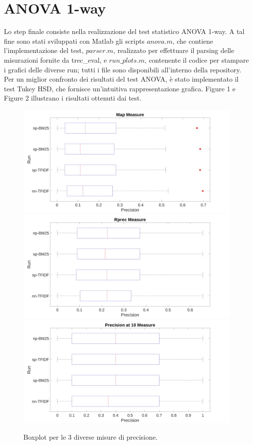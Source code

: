 \documentclass[a4paper, 11pt]{article}
\begin{document}
\section*{ANOVA 1-way}
\noindent
Lo step finale consiste nella realizzazione del test statistico ANOVA 1-way. A tal fine sono stati sviluppati con Matlab gli scripts $anova.m$, che contiene l'implementazione del test, $parser.m$, realizzato per effettuare il parsing delle misurazioni fornite da trec\_eval, e $run\_plots.m$, contenente il codice per stampare i grafici delle diverse run; tutti i file sono disponibili all'interno della repository. Per un miglior confronto dei risultati del test ANOVA, è stato implementato il test Tukey HSD, che fornisce un'intuitiva rappresentazione grafica.
Figure 1 e Figure 2 illustrano i risultati ottenuti dai test.
\\
\begin{figure}[!htb]
  \includegraphics[width=\linewidth]{../Plots/mean-boxplot.jpeg}
\endminipage\hfill
{}
  \includegraphics[width=\linewidth]{../Plots/rprec-boxplot.jpeg}
\endminipage\hfill
{}%
  \includegraphics[width=\linewidth]{../Plots/p10-boxplot.jpeg}
\endminipage
\caption{Boxplot per le 3 diverse misure di precisione.}
\end{figure}
 
\end{document}
